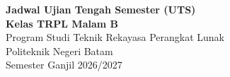 \documentclass[11pt,a4paper]{article}
\begin{document}
\begin{center}
	{\LARGE \textbf{Jadwal Ujian Tengah Semester (UTS)}} \\
	\vspace{0.3cm}
	{\Large \textbf{Kelas TRPL Malam B}} \\
	\vspace{0.5cm}
	{\large Program Studi Teknik Rekayasa Perangkat Lunak} \\
	Politeknik Negeri Batam \\
	Semester Ganjil 2026/2027
\end{center}

\vspace{0.5cm}

\noindent
\small
\renewcommand{\arraystretch}{1.5} %
\end{document}
